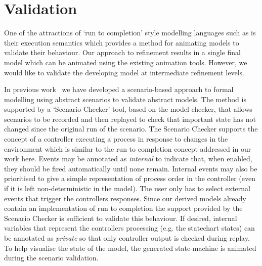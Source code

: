 

\section{Validation}
\label{sec:validation}

One of the attractions of `run to completion' style modelling languages such as \SCXML is their execution semantics which provides a method for animating models to validate their behaviour.
Our approach to \SCXML refinement results in a single \SCXML final model which can be animated using the existing \SCXML animation tools.
However, we would like to validate the developing \UMLB model at intermediate refinement levels. 

In previous work~\cite{snook20JSA} we have developed a scenario-based approach to formal modelling using abstract scenarios to validate abstract models.
The method is supported by a `Scenario Checker' tool, based on the \PROB model checker, that allows scenarios to be recorded and then replayed to check that important state has not changed since the original run of the scenario.
The Scenario Checker supports the concept of a controller executing a process in response to changes in the environment which is similar to the run to completion concept addressed in our work here.
Events may be annotated as \emph{internal} to indicate that, when enabled, they should be fired automatically until none remain.
Internal events may also be prioritised to give a simple representation of process order in the controller (even if it is left non-deterministic in the model).
The user only has to select external events that trigger the controllers responses.
Since our \SCXML derived models already contain an implementation of run to completion the support provided by the Scenario Checker is sufficient to validate this behaviour.
If desired, internal variables that represent the controllers processing (e.g. the \SCXML statechart states) can be annotated as \emph{private} so that only controller output is checked during replay.
To help visualise the state of the model, the generated \UMLB state-machine is animated during the scenario validation.

